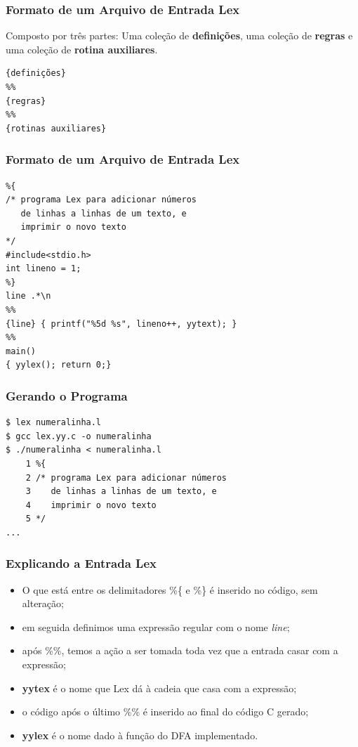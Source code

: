\documentclass[table]{beamer}
\begin{document}
\begin{frame}[fragile]
   \frametitle{Formato de um Arquivo de Entrada Lex}
   \begin{block}{Composto por três partes:}
   Uma coleção de \textbf{definições}, uma coleção de \textbf{regras} e uma coleção de \textbf{rotina auxiliares}.
   \end{block}
   \begin{verbatim}
{definições}
%%
{regras}
%%
{rotinas auxiliares}
   \end{verbatim}
\end{frame}

\begin{frame}[fragile]
   \frametitle{Formato de um Arquivo de Entrada Lex}
   \begin{verbatim}
%{
/* programa Lex para adicionar números
   de linhas a linhas de um texto, e 
   imprimir o novo texto
*/
#include<stdio.h>
int lineno = 1;
%} 
line .*\n
%%
{line} { printf("%5d %s", lineno++, yytext); }
%% 
main()
{ yylex(); return 0;}
   \end{verbatim}
\end{frame}

\begin{frame}[fragile]
   \frametitle{Gerando o Programa}
   \begin{verbatim}
$ lex numeralinha.l 
$ gcc lex.yy.c -o numeralinha
$ ./numeralinha < numeralinha.l 
    1 %{
    2 /* programa Lex para adicionar números
    3    de linhas a linhas de um texto, e 
    4    imprimir o novo texto
    5 */
...
   \end{verbatim}
\end{frame}

\begin{frame}
   \frametitle{Explicando a Entrada Lex}
   \begin{itemize}
      \item O que está entre os delimitadores \%\{ e \%\} é inserido no código, sem alteração;
      \item em seguida definimos uma expressão regular com o nome \textit{line};
      \item após \%\%, temos a ação a ser tomada toda vez que a entrada casar com a expressão;
      \item \textbf{yytex} é o nome que Lex dá à cadeia que casa com a expressão;
      \item o código após o último \%\% é inserido ao final do código C gerado;
      \item \textbf{yylex} é o nome dado à função do DFA implementado.
   \end{itemize}
\end{frame}
\end{document}
